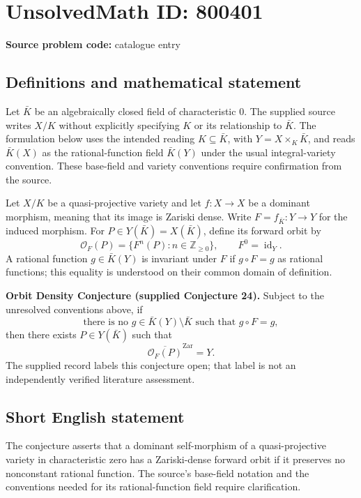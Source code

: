 \documentclass[11pt]{article}
\newcommand{\Z}{\mathbb{Z}}
\begin{document}
\section*{UnsolvedMath ID: 800401}
\textbf{Source problem code:} catalogue entry
\subsection{Definitions and mathematical statement}
Let \(\bar K\) be an algebraically closed field of characteristic \(0\). The supplied source writes \(X/K\) without explicitly specifying \(K\) or its relationship to \(\bar K\). The formulation below uses the intended reading \(K\subseteq\bar K\), with \(Y=X\times_K\bar K\), and reads \(\bar K(X)\) as the rational-function field \(\bar K(Y)\) under the usual integral-variety convention. These base-field and variety conventions require confirmation from the source.

Let \(X/K\) be a quasi-projective variety and let \(f:X\to X\) be a dominant morphism, meaning that its image is Zariski dense. Write \(F=f_{\bar K}:Y\to Y\) for the induced morphism. For \(P\in Y(\bar K)=X(\bar K)\), define its forward orbit by
\[
\mathcal O_F(P)=\{F^n(P):n\in\Z_{\geq 0}\},\qquad F^0=\operatorname{id}_Y.
\]
A rational function \(g\in\bar K(Y)\) is invariant under \(F\) if \(g\circ F=g\) as rational functions; this equality is understood on their common domain of definition.

\textbf{Orbit Density Conjecture (supplied Conjecture 24).} Subject to the unresolved conventions above, if
\[
\text{there is no }g\in\bar K(Y)\setminus\bar K\text{ such that }g\circ F=g,
\]
then there exists \(P\in Y(\bar K)\) such that
\[
\overline{\mathcal O_F(P)}^{\mathrm{Zar}}=Y.
\]
The supplied record labels this conjecture open; that label is not an independently verified literature assessment.
\subsection{Short English statement}
The conjecture asserts that a dominant self-morphism of a quasi-projective variety in characteristic zero has a Zariski-dense forward orbit if it preserves no nonconstant rational function. The source's base-field notation and the conventions needed for its rational-function field require clarification.
\end{document}
